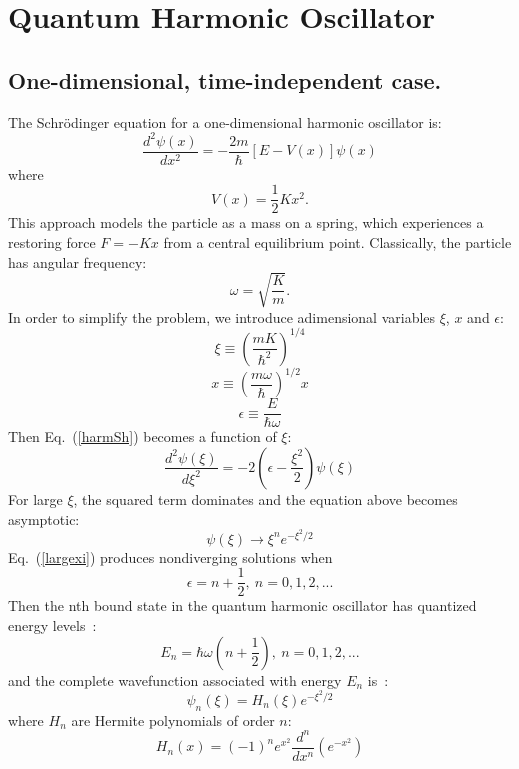 \documentclass[aps,prl,twocolumn,superscriptaddress]{revtex4-1}
\begin{document}
\section{Quantum Harmonic Oscillator}

      \subsection{One-dimensional, time-independent case.}

The Schr\"{o}dinger equation for a one-dimensional harmonic oscillator is:
\begin{equation}
\frac{d^2\psi(x)}{dx^2} = -\frac{2m}{\hbar}[E-V(x)]\psi(x) \label{harmSh}
\end{equation}
where 
$$V(x) = \frac{1}{2}Kx^2.$$
This approach models the particle as a mass on a spring, which experiences a restoring force $F = -Kx$ from a central 
equilibrium point. Classically, the particle has angular frequency:
\begin{equation}
\omega = \sqrt{\frac{K}{m}}. \label{freq}
\end{equation}
In order to simplify the problem, we introduce adimensional variables $\xi$, $x$ and $\epsilon$:
$$\xi \equiv (\frac{mK}{\hbar^2})^{1/4}$$
$$x \equiv (\frac{m\omega}{\hbar})^{1/2}x$$
$$\epsilon \equiv \frac{E}{\hbar\omega}$$
Then Eq.~(\ref{harmSh}) becomes a function of $\xi$:
\begin{equation}
\frac{d^2\psi(\xi)}{d\xi^2} = -2(\epsilon-\frac{\xi^2}{2})\psi(\xi) \label{shroxi}
\end{equation}
For large $\xi$, the squared term dominates and the equation above becomes asymptotic:
\begin{equation}
\psi(\xi) \rightarrow \xi^ne^{-\xi^2/2} \label{largexi}
\end{equation}
Eq.~(\ref{largexi}) produces nondiverging solutions when
\begin{equation}
\epsilon = n+\frac{1}{2},~n=0,1,2,...
\end{equation}
Then the nth bound state in the quantum harmonic oscillator has quantized energy levels~\cite{code}:
\begin{equation}
E_n = \hbar \omega (n+\frac{1}{2}),~n=0,1,2,... \label{harmE}
\end{equation}
and the complete wavefunction associated with energy $E_n$ is~\cite{Schrodinger_wave}:
\begin{equation}
 \psi_{n}(\xi) = H_{n}(\xi) e^{-\xi^2/2}
\end{equation}
where $H_n$ are Hermite polynomials of order $n$:
$$H_{n}(x) = (-1)^n e^{x^2} \frac{d^n}{dx^n}(e^{-x^2})$$
\end{document}
